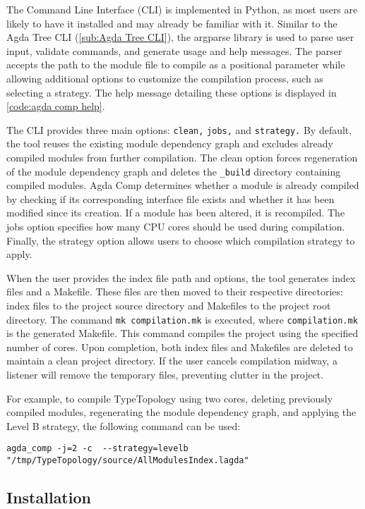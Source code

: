 The Command Line Interface (CLI) is implemented in Python, as most users are
likely to have it installed and may already be familiar with it. Similar to the
Agda Tree CLI (\cref{sub:Agda Tree CLI}), the argparse library is used to parse
user input, validate commands, and generate usage and help messages. The parser
accepts the path to the module file to compile as a positional parameter while
allowing additional options to customize the compilation process, such as
selecting a strategy. The help message detailing these options is displayed in
\cref{code:agda comp help}.

The CLI provides three main options: \texttt{clean,} \texttt{jobs,} and
\texttt{strategy.} By default, the tool reuses the existing module dependency
graph and excludes already compiled modules from further compilation. The clean
option forces regeneration of the module dependency graph and deletes the
\texttt{\_build} directory containing compiled modules. Agda Comp determines
whether a module is already compiled by checking if its corresponding interface
file exists and whether it has been modified since its creation. If a module
has been altered, it is recompiled. The jobs option specifies how many CPU
cores should be used during compilation. Finally, the strategy option allows
users to choose which compilation strategy to apply.


When the user provides the index file path and options, the tool
generates index files and a Makefile. These files are then moved to their
respective directories: index files to the project source directory and
Makefiles to the project root directory. The command \texttt{mk compilation.mk} is
executed, where \texttt{compilation.mk} is the generated Makefile. This command
compiles the project using the specified number of cores. Upon completion, both
index files and Makefiles are deleted to maintain a clean project directory. If
the user cancels compilation midway, a listener will remove the temporary
files, preventing clutter in the project.


For example, to compile TypeTopology using two cores, deleting previously
compiled modules, regenerating the module dependency graph, and applying the
Level B strategy, the following command can be used:

\begin{lstlisting}
agda_comp -j=2 -c  --strategy=levelb "/tmp/TypeTopology/source/AllModulesIndex.lagda"
\end{lstlisting}

\subsection{Installation}

